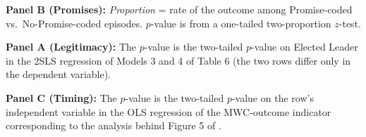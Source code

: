 \begin{table}[ht]
\begin{threeparttable}
{\begin{tabular}{l@{\hskip 24pt} c@{\hskip 10pt}c @{\hskip 24pt} c@{\hskip 10pt}c @{\hskip 24pt} c@{\hskip 10pt}c}
\bottomrule
\end{tabular}
}
\vspace{8pt}
\begin{tablenotes}[flushleft]\footnotesize
\setlength{\itemsep}{6pt}
\item \textbf{Panel B (Promises):} \textit{Proportion} = rate of the outcome among Promise-coded vs.\ No-Promise-coded episodes. \(p\)-value is from a one-tailed two-proportion \(z\)-test.
\item \textbf{Panel A (Legitimacy):} The \(p\)-value is the two-tailed \(p\)-value on Elected Leader in the 2SLS regression of Models 3 and 4 of Table 6 (the two rows differ only in the dependent variable).
\item \textbf{Panel C (Timing):} The \(p\)-value is the two-tailed \(p\)-value on the row's independent variable in the OLS regression of the MWC-outcome indicator corresponding to the analysis behind Figure 5 of \cite{BH_JEP_2023}.
\end{tablenotes}
\end{threeparttable}
\end{table}

